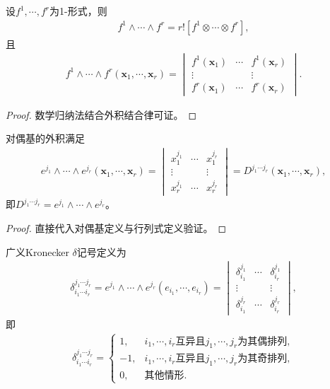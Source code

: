 \documentclass[../../main.tex]{subfiles}%
\begin{document}
\begin{proposition}
设$f^1,\cdots,f^r$为1-形式，则
\begin{align}
f^1\wedge\cdots\wedge f^r=r![f^1\otimes\cdots\otimes f^r],
\label{eq:r_wedge_1form}
\end{align}
且
\begin{align*}
f^1\wedge\cdots\wedge f^r(\boldsymbol{x}_1,\cdots,\boldsymbol{x}_r)=
\begin{vmatrix}
f^1(\boldsymbol{x}_1) & \cdots & f^1(\boldsymbol{x}_r)\\
\vdots & & \vdots\\
f^r(\boldsymbol{x}_1) & \cdots & f^r(\boldsymbol{x}_r)
\end{vmatrix}.
\end{align*}
\end{proposition}
\begin{proof}

数学归纳法结合外积结合律可证。

\end{proof}

\begin{proposition}
对偶基的外积满足
\begin{align}
e^{j_1}\wedge\cdots\wedge e^{j_r}(\boldsymbol{x}_1,\cdots,\boldsymbol{x}_r)=
\begin{vmatrix}
x_1^{j_1} & \cdots & x_1^{j_r}\\
\vdots & & \vdots\\
x_r^{j_1} & \cdots & x_r^{j_r}
\end{vmatrix}=D^{j_1\cdots j_r}(\boldsymbol{x}_1,\cdots,\boldsymbol{x}_r),
\label{eq:basis_wedge_det}
\end{align}
即$D^{j_1\cdots j_r}=e^{j_1}\wedge\cdots\wedge e^{j_r}$。
\end{proposition}
\begin{proof}

直接代入对偶基定义与行列式定义验证。

\end{proof}

\begin{definition}
广义Kronecker $\delta$记号定义为
\begin{align}
\delta_{i_1\cdots i_r}^{j_1\cdots j_r}=e^{j_1}\wedge\cdots\wedge e^{j_r}(e_{i_1},\cdots,e_{i_r})=
\begin{vmatrix}
\delta_{i_1}^{j_1} & \cdots & \delta_{i_r}^{j_1}\\
\vdots & & \vdots\\
\delta_{i_1}^{j_r} & \cdots & \delta_{i_r}^{j_r}
\end{vmatrix},
\label{eq:general_kronecker}
\end{align}
即
\begin{align*}
\delta_{i_1\cdots i_r}^{j_1\cdots j_r}=
\begin{cases}
1, & i_1,\cdots,i_r\text{互异且}j_1,\cdots,j_r\text{为其偶排列},\\
-1, & i_1,\cdots,i_r\text{互异且}j_1,\cdots,j_r\text{为其奇排列},\\
0, & \text{其他情形}.
\end{cases}
\end{align*}
\end{definition}
\end{document}
